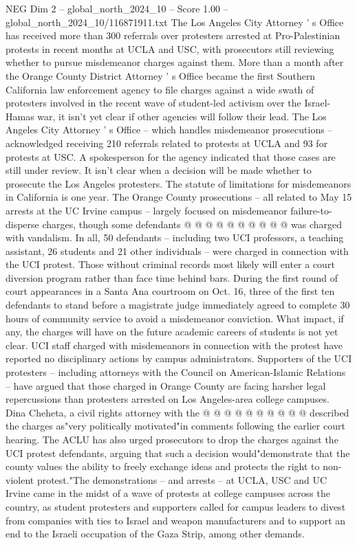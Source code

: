 \begin{textsample}{NEG Dim 2 – global\_north\_2024\_10 – Score 1.00 – global\_north\_2024\_10/116871911.txt}  \label{ex:f2_neg_364}
The Los Angeles City Attorney ' s Office has received more than 300 referrals over protesters arrested at Pro-Palestinian protests in recent months at UCLA and USC, with prosecutors still reviewing whether to pursue misdemeanor charges against them.
More than a month after the Orange County District Attorney ' s Office became the first Southern California law enforcement agency to file charges against a wide swath of protesters involved in the recent wave of student-led activism over the Israel-Hamas war, it isn't yet clear if other agencies will follow their lead.
The Los Angeles City Attorney ' s Office -- which handles misdemeanor prosecutions -- acknowledged receiving 210 referrals related to protests at UCLA and 93 for protests at USC.
A spokesperson for the agency indicated that those cases are still under review.
It isn't clear when a decision will be made whether to prosecute the Los Angeles protesters.
The statute of limitations for misdemeanors in California is one year.
The Orange County prosecutions -- all related to May 15 arrests at the UC Irvine campus -- largely focused on misdemeanor failure-to-disperse charges, though some defendants @ @ @ @ @ @ @ @ @ @ was charged with vandalism.
In all, 50 defendants -- including two UCI professors, a teaching assistant, 26 students and 21 other individuals -- were charged in connection with the UCI protest.
Those without criminal records most likely will enter a court diversion program rather than face time behind bars.
During the first round of court appearances in a Santa Ana courtroom on Oct. 16, three of the first ten defendants to stand before a magistrate judge immediately agreed to complete 30 hours of community service to avoid a misdemeanor conviction.
What impact, if any, the charges will have on the future academic careers of students is not yet clear.
UCI staff charged with misdemeanors in connection with the protest have reported no disciplinary actions by campus administrators.
Supporters of the UCI protesters -- including attorneys with the Council on American-Islamic Relations -- have argued that those charged in Orange County are facing harsher legal repercussions than protesters arrested on Los Angeles-area college campuses.
Dina Cheheta, a civil rights attorney with the @ @ @ @ @ @ @ @ @ @ described the charges as"very politically motivated"in comments following the earlier court hearing.
The ACLU has also urged prosecutors to drop the charges against the UCI protest defendants, arguing that such a decision would"demonstrate that the county values the ability to freely exchange ideas and protects the right to non-violent protest."The demonstrations -- and arrests -- at UCLA, USC and UC Irvine came in the midst of a wave of protests at college campuses across the country, as student protesters and supporters called for campus leaders to divest from companies with ties to Israel and weapon manufacturers and to support an end to the Israeli occupation of the Gaza Strip, among other demands.

\end{textsample}
